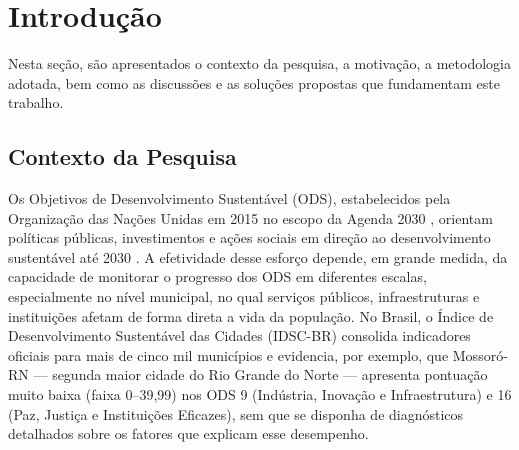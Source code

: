 \chapter{Introdução}
\label{cap:introducao}

Nesta seção, são apresentados o contexto da pesquisa, a motivação, a
metodologia adotada, bem como as discussões e as soluções propostas que
fundamentam este trabalho.

\section{Contexto da Pesquisa}
\label{sec:contexto}

Os Objetivos de Desenvolvimento Sustentável (\gls{ODS}), estabelecidos pela
Organização das Nações Unidas em 2015 no escopo da Agenda 2030
\cite{onu2015}, orientam políticas públicas, investimentos e ações sociais
em direção ao desenvolvimento sustentável até 2030 \cite{massey2022}. A
efetividade desse esforço depende, em grande medida, da capacidade de
monitorar o progresso dos ODS em diferentes escalas, especialmente no nível
municipal, no qual serviços públicos, infraestruturas e instituições afetam
de forma direta a vida da população. No Brasil, o Índice de Desenvolvimento
Sustentável das Cidades (\gls{IDSC}-BR) consolida indicadores oficiais para
mais de cinco mil municípios e evidencia, por exemplo, que Mossoró-RN ---
segunda maior cidade do Rio Grande do Norte --- apresenta pontuação muito
baixa (faixa 0--39,99) nos \gls{ODS} 9 (Indústria, Inovação e
Infraestrutura) e 16 (Paz, Justiça e Instituições Eficazes), sem que se disponha de diagnósticos detalhados sobre os
fatores que explicam esse desempenho.

